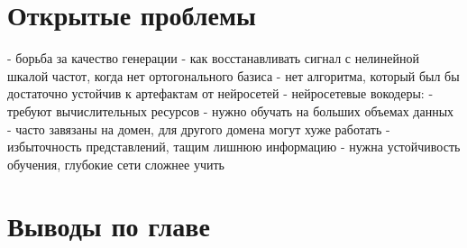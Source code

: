 \section{Открытые проблемы}
 - борьба за качество генерации
 - как восстанавливать сигнал с нелинейной шкалой частот, когда нет ортогонального базиса
 - нет алгоритма, который был бы достаточно устойчив к артефактам от нейросетей
 - нейросетевые вокодеры:
   - требуют вычислительных ресурсов
   - нужно обучать на больших объемах данных
   - часто завязаны на домен, для другого домена могут хуже работать
 - избыточность представлений, тащим лишнюю информацию
 - нужна устойчивость обучения, глубокие сети сложнее учить

\section{Выводы по главе}

